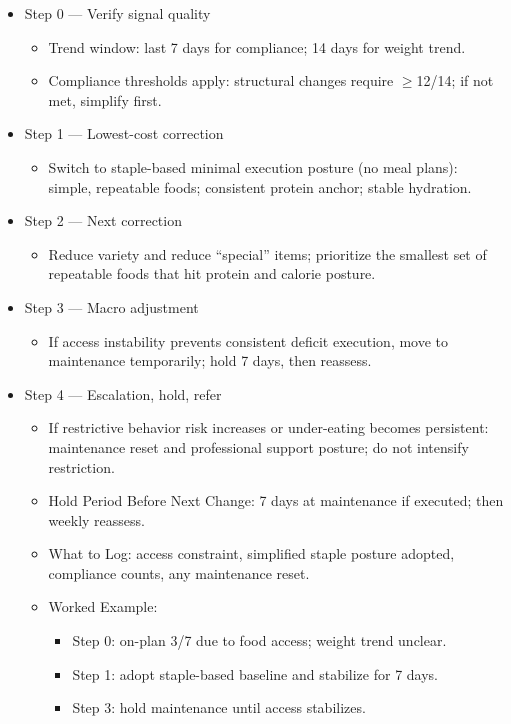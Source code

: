 \documentclass[10pt]{article}
\begin{document}
\begin{itemize}
\item Step 0 — Verify signal quality
  \begin{itemize}
  \item Trend window: last 7 days for compliance; 14 days for weight trend.
  \item Compliance thresholds apply: structural changes require $\geq$12/14; if not met, simplify first.
  \end{itemize}
\item Step 1 — Lowest-cost correction
  \begin{itemize}
  \item Switch to staple-based minimal execution posture (no meal plans): simple, repeatable foods; consistent protein anchor; stable hydration.
  \end{itemize}
\item Step 2 — Next correction
  \begin{itemize}
  \item Reduce variety and reduce “special” items; prioritize the smallest set of repeatable foods that hit protein and calorie posture.
  \end{itemize}
\item Step 3 — Macro adjustment
  \begin{itemize}
  \item If access instability prevents consistent deficit execution, move to maintenance temporarily; hold 7 days, then reassess.
  \end{itemize}
\item Step 4 — Escalation, hold, refer
  \begin{itemize}
  \item If restrictive behavior risk increases or under-eating becomes persistent: maintenance reset and professional support posture; do not intensify restriction.
  \item Hold Period Before Next Change: 7 days at maintenance if executed; then weekly reassess.
  \item What to Log: access constraint, simplified staple posture adopted, compliance counts, any maintenance reset.
  \item Worked Example:
    \begin{itemize}
    \item Step 0: on-plan 3/7 due to food access; weight trend unclear.
    \item Step 1: adopt staple-based baseline and stabilize for 7 days.
    \item Step 3: hold maintenance until access stabilizes.
    \end{itemize}
  \end{itemize}
\end{itemize}
\end{document}
